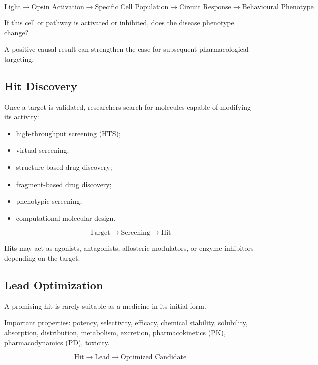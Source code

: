 \documentclass[11pt]{article}
\begin{document}
\[
\text{Light} \rightarrow \text{Opsin Activation} \rightarrow
\text{Specific Cell Population} \rightarrow \text{Circuit Response}
\rightarrow \text{Behavioural Phenotype}
\]

\begin{tcolorbox}[colback=Maroon!5,colframe=Maroon,
  title=\textbf{Causal Target Validation},fonttitle=\bfseries]
If this cell or pathway is activated or inhibited, does the
disease phenotype change?

A positive causal result can strengthen the case for subsequent
pharmacological targeting.
\end{tcolorbox}

\subsection{Hit Discovery}

Once a target is validated, researchers search for molecules
capable of modifying its activity:

\begin{itemize}[nosep]
\item high-throughput screening (HTS);
\item virtual screening;
\item structure-based drug discovery;
\item fragment-based drug discovery;
\item phenotypic screening;
\item computational molecular design.
\end{itemize}

\[
\text{Target} \rightarrow \text{Screening} \rightarrow \text{Hit}
\]

Hits may act as agonists, antagonists, allosteric modulators, or
enzyme inhibitors depending on the target.

\subsection{Lead Optimization}

A promising hit is rarely suitable as a medicine in its initial form.

Important properties: potency, selectivity, efficacy, chemical
stability, solubility, absorption, distribution, metabolism,
excretion, pharmacokinetics (PK), pharmacodynamics (PD), toxicity.

\[
\boxed{\text{Hit} \rightarrow \text{Lead} \rightarrow \text{Optimized Candidate}}
\]
\end{document}
